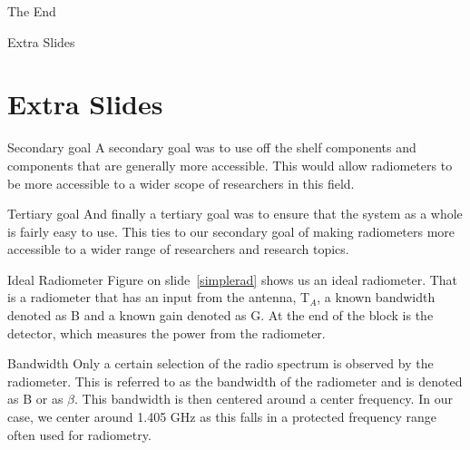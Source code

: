 \documentclass{beamer}
\begin{document}
\begin{frame}
\Huge{\centerline{The End}}
\end{frame}

\begin{frame}
\Huge{\centerline{Extra Slides}}
\end{frame}
\section*{Extra Slides}

\begin{frame}
\begin{block}{Secondary goal}
A secondary goal was to use off the shelf components and components that are generally more accessible.  This would allow radiometers to be more accessible to a wider scope of researchers in this field.
\end{block} 

\begin{block}{Tertiary goal}
And finally a tertiary goal was to ensure that the system as a whole is fairly easy to use.  This ties to our secondary goal of making radiometers more accessible to a wider range of researchers and research topics.
\end{block}
\end{frame}

\begin{frame}
\begin{block}{Ideal Radiometer}
Figure on slide~\ref{simplerad} shows us an ideal radiometer.  That is a radiometer that has an input from the antenna, T$_{A}$, a known bandwidth denoted as B and a known gain denoted as G.  At the end of the block is the detector, which measures the power from the radiometer.
\end{block}
\end{frame}

\begin{frame}
\begin{block}{Bandwidth}
Only a certain selection of the radio spectrum is observed by the radiometer.  This is referred to as the bandwidth of the radiometer and is denoted as B or as $\beta$.  This bandwidth is then centered around a center frequency.  In our case, we center around 1.405 GHz as this falls in a protected frequency range often used for radiometry.  
\end{block}
\end{frame}
\end{document}
